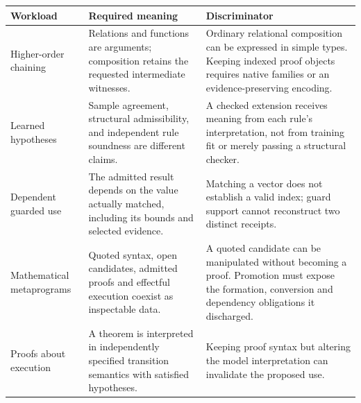 \documentclass[11pt]{article}
\theoremstyle{definition}
\theoremstyle{remark}
\begin{document}
\begin{center}\small
\begin{tabular}{>{\raggedright\arraybackslash}p{}
  >{\raggedright\arraybackslash}p{}
  >{\raggedright\arraybackslash}p{}}
\textbf{Workload} & \textbf{Required meaning} & \textbf{Discriminator} \\
\hline
Higher-order chaining & Relations and functions are arguments; composition
  retains the requested intermediate witnesses. & Ordinary relational
  composition can be expressed in simple types. Keeping indexed proof
  objects requires native families or an evidence-preserving encoding. \\
Learned hypotheses & Sample agreement, structural admissibility, and
  independent rule soundness are different claims. & A checked extension
  receives meaning from each rule's interpretation, not from training fit
  or merely passing a structural checker. \\
Dependent guarded use & The admitted result depends on the value actually
  matched, including its bounds and selected evidence. & Matching a vector
  does not establish a valid index; guard support cannot reconstruct two
  distinct receipts. \\
Mathematical metaprograms & Quoted syntax, open candidates, admitted proofs
  and effectful execution coexist as inspectable data. & A quoted candidate
  can be manipulated without becoming a proof. Promotion must expose the
  formation, conversion and dependency obligations it discharged. \\
Proofs about execution & A theorem is interpreted in independently specified
  transition semantics with satisfied hypotheses. & Keeping proof syntax
  but altering the model interpretation can invalidate the proposed use. \\
\end{tabular}
\end{center}
\end{document}
